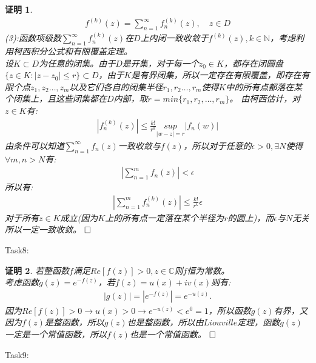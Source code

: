 \documentclass{ctexart}
\newcommand{\。}{．} %
\newenvironment{lanse}{
    \begin{tcolorbox}[breakable,enhanced, colback=qlan, boxrule=0pt, frame hidden,
        borderline west={0.7mm}{0.1mm}{slan}]
    }
    {\end{tcolorbox}}
\theoremstyle{t} %
\newtheorem*{zmhj}{\color{slan} 证明}
\newenvironment{zm}{\begin{lanse}\begin{zmhj}}{$\hfill \square$\end{zmhj}\end{lanse}}
\begin{document}
\begin{zm}
\begin{align*}
        f^{(k)}(z)=\sum_{n=1}^{\infty}f_{n}^{(k)}(z),\quad z\in D
    \end{align*}
    (3):函数项级数$\sum_{n=1}^{\infty}f^{(k)}_{n}(z)$在$D$上内闭一致收敛于$f^{(k)}(z),k\in\mathbb{N}$，考虑利用柯西积分公式和有限覆盖定理。\\
    设$K\subset D$为任意的闭集。由于$D$是开集，对于每一个$z_0\in K$，都存在闭圆盘$\{z\in K:|z-z_0|\le r\}\subset D$，由于$K$是有界闭集，所以一定存在有限覆盖，即存在有限个点$z_1,z_2\dots ,z_m$以及它们各自的闭集半径$r_1,r_2\dots,r_m$使得$K$中的所有点都落在某个闭集上，且这些闭集都在$D$内部，取$r=min\{r_1,r_2,\dots,r_m\}$。
    由柯西估计，对$z\in K$有:
    \begin{align*}
        |f_{n}^{(k)}(z)|\le \frac{k!}{r^k}\underset{|w-z|=r}{sup}|f_{n}(w)|
    \end{align*}
    由条件可以知道$\sum_{n=1}^{\infty}f_{n}(z)$一致收敛与$f(z)$，所以对于任意的$\epsilon>0,\exists N$使得$\forall m,n>N$有:
    \begin{align*}
        \left|\sum_{n=1}^{m}f_{n}(z)\right|<\epsilon 
    \end{align*}
    所以有:
    \begin{align*}
        \left|\sum_{n=1}^{m}f_{n}^{(k)}(z)\right|\le \frac{k!}{r^k}\epsilon
    \end{align*}
    对于所有$z\in K$成立(因为$K$上的所有点一定落在某个半径为$r$的圆上)，而$\epsilon$与$N$无关所以一定一致收敛。
\end{zm}
Task8:
\begin{zm}
    若整函数$f$满足$Re[f(z)]>0,z\in\mathbb{C}$则$f$恒为常数。\\
    考虑函数$g(z)=e^{-f(z)}$，若$f(z)=u(x)+iv(x)$则有:
    \begin{align*}
        |g(z)|=\left|e^{-f(z)}\right|=e^{-u(z)}.
    \end{align*}
    因为$Re[f(z)]>0\rightarrow u(x)>0\rightarrow e^{-u(z)}<e^0=1$，所以函数$g(z)$有界，又因为$f(z)$是整函数，所以$g(z)$也是整函数，所以由$Liouville$定理，函数$g(z)$一定是一个常值函数，所以$f(z)$也是一个常值函数。
\end{zm}
Task9:
\end{document}
